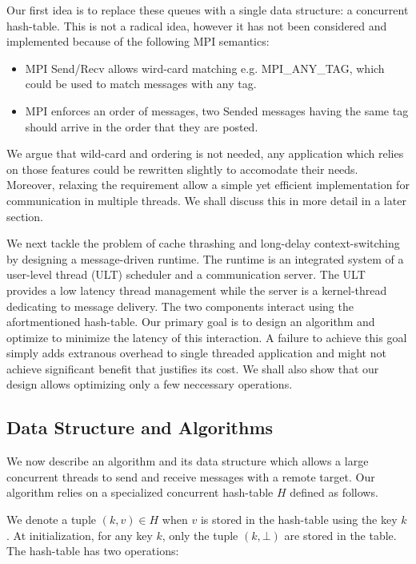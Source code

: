 \documentclass[11pt]{article}
\begin{document}
Our first idea is to replace these queues with a single data structure: a
concurrent hash-table. This is not a radical idea, however it has not been
considered and implemented because of the following MPI semantics:

\begin{itemize}
  \item MPI Send/Recv allows wird-card matching e.g. MPI\_ANY\_TAG, which could
    be used to match messages with any tag.
  \item MPI enforces an order of messages, two Sended messages having the same
    tag should arrive in the order that they are posted.
\end{itemize}

We argue that wild-card and ordering is not needed, any application which
relies on those features could be rewritten slightly to accomodate their needs.
Moreover, relaxing the requirement allow a simple yet efficient implementation
for communication in multiple threads. We shall discuss this in more detail
in a later section.

We next tackle the problem of cache thrashing and long-delay context-switching
by designing a message-driven runtime. The runtime is an integrated system of a
user-level thread (ULT) scheduler and a communication server. The ULT provides
a low latency thread management while the server is a kernel-thread dedicating
to message delivery. The two components interact using the afortmentioned
hash-table.  Our primary goal is to design an algorithm and optimize to
minimize the latency of this interaction. A failure to achieve this goal simply
adds extranous overhead to single threaded application and might not achieve
significant benefit that justifies its cost. We shall also show that our design 
allows optimizing only a few neccessary operations.

\subsection{Data Structure and Algorithms}
We now describe an algorithm and its data structure which allows a large
concurrent threads to send and receive messages with a remote target. Our
algorithm relies on a specialized concurrent hash-table $H$ defined as follows.

We denote a tuple $(k,v) \in H$ when $v$ is stored in the hash-table using the
key $k$. At initialization, for any key $k$, only the tuple $(k,\bot)$ are
stored in the table. The hash-table has two operations: 
\end{document}

